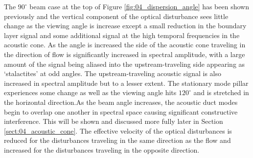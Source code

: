 The $90^\circ$ beam case at the top of Figure \ref{fig:04_dispersion_angle} has been shown previously and the vertical component of the optical  disturbance sees little change as the viewing angle is increase except a small reduction in the boundary layer signal and some additional signal at the high temporal frequencies in the acoustic cone.
As the angle is increased the side of the acoustic cone traveling in the direction of flow is significantly increased in spectral amplitude, with a large amount of the signal being aliased into the upstream-traveling side appearing as `stalactites' at odd angles.
The upstream-traveling acoustic signal is also increased in spectral amplitude but to a lesser extent.
The stationary mode pillar experiences some change as well as the viewing angle hits $120^\circ$ and is stretched in the horizontal direction.As the beam angle increases, the acoustic duct modes begin to overlap one another in spectral space causing significant constructive interference.
This will be shown and discussed more fully later in Section \ref{sect:04_acoustic_cone}.
The effective velocity of the optical disturbances is reduced for the disturbances traveling in the same direction as the flow and increased for the disturbances traveling in the opposite direction.


